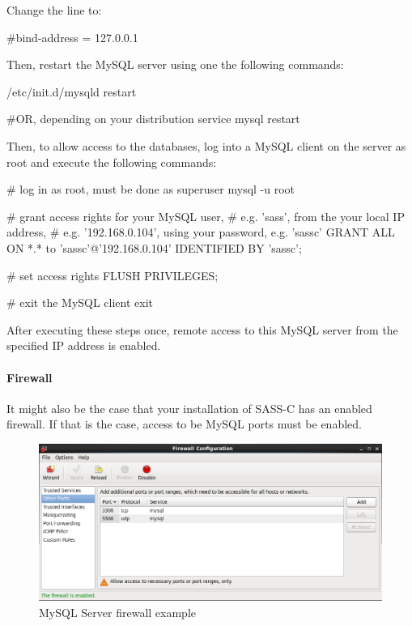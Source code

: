 Change the line to:

\begin{cverbatim}
#bind-address = 127.0.0.1
\end{cverbatim}

Then, restart the MySQL server using one the following commands:

\begin{cverbatim}
/etc/init.d/mysqld restart

#OR, depending on your distribution
service mysql restart
\end{cverbatim}

Then, to allow access to the databases, log into a MySQL client on the server as root and execute the following commands:

\begin{cverbatim}
# log in as root, must be done as superuser
mysql -u root

# grant access rights for your MySQL user, 
# e.g. 'sass', from the your local IP address, 
# e.g. '192.168.0.104', using your password, e.g. 'sassc'
GRANT ALL ON *.* to 'sassc'@'192.168.0.104' IDENTIFIED BY 'sassc';

# set access rights
FLUSH PRIVILEGES;

# exit the MySQL client
exit
\end{cverbatim}

After executing these steps once, remote access to this MySQL server from the specified IP address is enabled.

\paragraph{Firewall}

It might also be the case that your installation of SASS-C has an enabled firewall. If that is the case, access to be MySQL ports must be enabled.

\begin{figure}[H]
  \center
    \includegraphics[width=15cm,frame]{../screenshots/centos_firewall.png}
  \caption{MySQL Server firewall example}
\end{figure}

